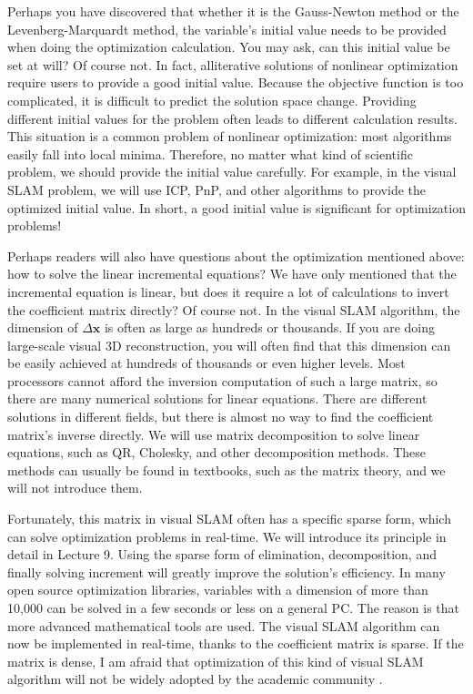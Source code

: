 Perhaps you have discovered that whether it is the Gauss-Newton method or the Levenberg-Marquardt method, the variable's initial value needs to be provided when doing the optimization calculation. You may ask, can this initial value be set at will? Of course not. In fact, alliterative solutions of nonlinear optimization require users to provide a good initial value. Because the objective function is too complicated, it is difficult to predict the solution space change. Providing different initial values ​​for the problem often leads to different calculation results. This situation is a common problem of nonlinear optimization: most algorithms easily fall into local minima. Therefore, no matter what kind of scientific problem, we should provide the initial value carefully. For example, in the visual SLAM problem, we will use ICP, PnP, and other algorithms to provide the optimized initial value. In short, a good initial value is significant for optimization problems!

Perhaps readers will also have questions about the optimization mentioned above: how to solve the linear incremental equations? We have only mentioned that the incremental equation is linear, but does it require a lot of calculations to invert the coefficient matrix directly? Of course not. In the visual SLAM algorithm, the dimension of $\Delta \mathbf{x}$ is often as large as hundreds or thousands. If you are doing large-scale visual 3D reconstruction, you will often find that this dimension can be easily achieved at hundreds of thousands or even higher levels. Most processors cannot afford the inversion computation of such a large matrix, so there are many numerical solutions for linear equations. There are different solutions in different fields, but there is almost no way to find the coefficient matrix's inverse directly. We will use matrix decomposition to solve linear equations, such as QR, Cholesky, and other decomposition methods. These methods can usually be found in textbooks, such as the matrix theory, and we will not introduce them.

Fortunately, this matrix in visual SLAM often has a specific sparse form, which can solve optimization problems in real-time. We will introduce its principle in detail in Lecture 9. Using the sparse form of elimination, decomposition, and finally solving increment will greatly improve the solution's efficiency. In many open source optimization libraries, variables with a dimension of more than 10,000 can be solved in a few seconds or less on a general PC. The reason is that more advanced mathematical tools are used. The visual SLAM algorithm can now be implemented in real-time, thanks to the coefficient matrix is ​​sparse. If the matrix is ​​dense, I am afraid that optimization of this kind of visual SLAM algorithm will not be widely adopted by the academic community \textsuperscript{\cite{Lourakis2009, Sibley2009a, Triggs2000 }}.

